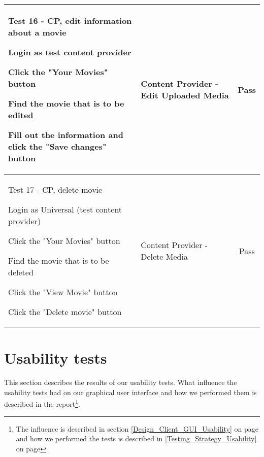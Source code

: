 \begin{centering}
\begin{longtable}{| p{5 cm} | p{7 cm} | c |}
\hline
Test 16 - CP, edit information about a movie
\begin{my_enumerate}
\item Login as test content provider
\item Click the "Your Movies" button
\item Find the movie that is to be edited
\item Fill out the information and click the "Save changes" button
\end{my_enumerate} & Content Provider - Edit Uploaded Media & Pass  \\

\hline
Test 17 - CP, delete movie
\begin{my_enumerate}
\item Login as Universal (test content provider)
\item Click the "Your Movies" button
\item Find the movie that is to be deleted
\item Click the "View Movie" button
\item Click the "Delete movie" button
\end{my_enumerate} & Content Provider - Delete Media & Pass \\
\end{longtable}
\end{centering}	

\section{Usability tests}
\label{Appendix_Test_Usability}
This section describes the results of our usability tests. What influence the usability tests had on our graphical user interface and how we performed them is described in the report\footnote{The influence is described in section \ref {Design_Client_GUI_Usability} on page \pageref{Design_Client_GUI_Usability} and how we performed the tests is described in \ref{Testing_Strategy_Usability} on page \pageref{Testing_Strategy_Usability}}.